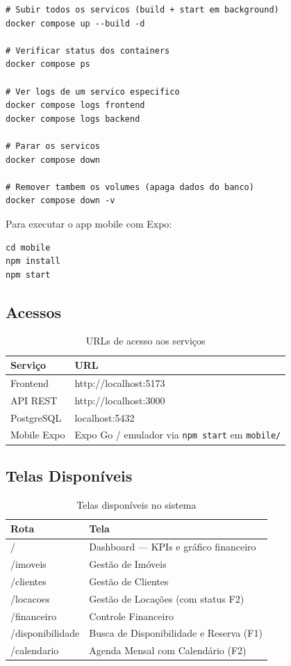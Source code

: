 \documentclass[12pt, a4paper]{article}
\newcommand{\thead}[1]{\cellcolor{tableheader}\color{white}\bfseries #1}
\newcommand{\talt}{\rowcolor{tablerowalt}}
\begin{document}
\begin{lstlisting}
# Subir todos os servicos (build + start em background)
docker compose up --build -d

# Verificar status dos containers
docker compose ps

# Ver logs de um servico especifico
docker compose logs frontend
docker compose logs backend

# Parar os servicos
docker compose down

# Remover tambem os volumes (apaga dados do banco)
docker compose down -v
\end{lstlisting}

Para executar o app mobile com Expo:

\begin{lstlisting}
cd mobile
npm install
npm start
\end{lstlisting}

\subsection{Acessos}

\begin{table}[H]
\centering
\begin{tabular}{|l|l|}
\hline
\thead{Serviço} & \thead{URL} \\
\hline
Frontend    & http://localhost:5173 \\
\talt API REST    & http://localhost:3000 \\
PostgreSQL  & localhost:5432 \\
\talt Mobile Expo & Expo Go / emulador via \texttt{npm start} em \texttt{mobile/} \\
\hline
\end{tabular}
\caption{URLs de acesso aos serviços}
\end{table}

\subsection{Telas Disponíveis}

\begin{table}[H]
\centering
\begin{tabularx}{\textwidth}{|l|X|}
\hline
\thead{Rota} & \thead{Tela} \\
\hline
/                & Dashboard — KPIs e gráfico financeiro \\
\talt /imoveis        & Gestão de Imóveis \\
/clientes        & Gestão de Clientes \\
\talt /locacoes       & Gestão de Locações (com status F2) \\
/financeiro      & Controle Financeiro \\
\talt /disponibilidade & Busca de Disponibilidade e Reserva (F1) \\
/calendario      & Agenda Mensal com Calendário (F2) \\
\hline
\end{tabularx}
\caption{Telas disponíveis no sistema}
\end{table}
\end{document}
